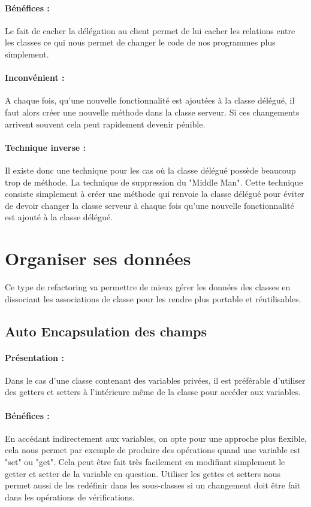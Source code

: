\documentclass[a4paper,twoside,12pt,openright]{report}
\begin{document}
\paragraph{Bénéfices :}
Le fait de cacher la délégation au client permet de lui cacher les relations entre les classes ce qui nous permet de changer le code de nos programmes plus simplement.

\paragraph{Inconvénient :}
A chaque fois, qu'une nouvelle fonctionnalité est ajoutées à la classe délégué, il faut alors créer une nouvelle méthode dans la classe serveur. Si ces changements arrivent souvent cela peut rapidement devenir pénible.

\paragraph{Technique inverse :}
Il existe donc une technique pour les cas où la classe délégué possède beaucoup trop de méthode.
La technique de suppression du "Middle Man".
Cette technique consiste simplement à créer une méthode qui renvoie la classe délégué pour éviter de devoir changer la classe serveur à chaque fois qu'une nouvelle fonctionnalité est ajouté à la classe délégué.\\


\newpage
\section{Organiser ses données}
Ce type de refactoring va permettre de mieux gérer les données des classes en dissociant les associations de classe pour les rendre plus portable et réutilisables.\\


\subsection{Auto Encapsulation des champs}
\paragraph{Présentation :}
Dans le cas d'une classe contenant des variables privées, il est préférable d'utiliser des getters et setters à l'intérieure même de la classe pour accéder aux variables.

\paragraph{Bénéfices :}
En accédant indirectement aux variables, on opte pour une approche plus flexible, cela nous permet par exemple de produire des opérations quand une variable est "set" ou "get". Cela peut être fait très facilement en modifiant simplement le getter et setter de la variable en question.
Utiliser les gettes et setters nous permet aussi de les redéfinir dans les sous-classes si un changement doit être fait dans les opérations de vérifications.\\
\end{document}
